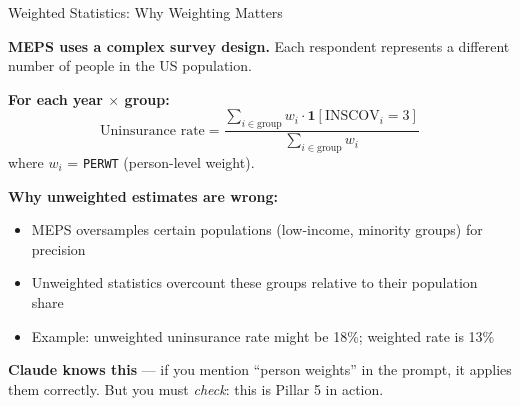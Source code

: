 \documentclass[10pt,english,aspectratio=169]{beamer}
\begin{document}
\begin{frame}{Weighted Statistics: Why Weighting Matters}

\textbf{MEPS uses a complex survey design.} Each respondent represents a different number of people in the US population.

\vspace{0.3cm}
\textbf{For each year $\times$ group:}
\[
\text{Uninsurance rate} = \frac{\sum_{i \in \text{group}} w_i \cdot \mathbf{1}[\text{INSCOV}_i = 3]}{\sum_{i \in \text{group}} w_i}
\]
where $w_i$ = \texttt{PERWT} (person-level weight).

\vspace{0.3cm}
\textbf{Why unweighted estimates are wrong:}
\begin{itemize}
    \item MEPS oversamples certain populations (low-income, minority groups) for precision
    \item Unweighted statistics overcount these groups relative to their population share
    \item Example: unweighted uninsurance rate might be 18\%; weighted rate is 13\%
\end{itemize}

\vspace{0.3cm}
\textbf{Claude knows this} --- if you mention ``person weights'' in the prompt, it applies them correctly. But you must \emph{check}: this is Pillar 5 in action.

\end{frame}
\end{document}
